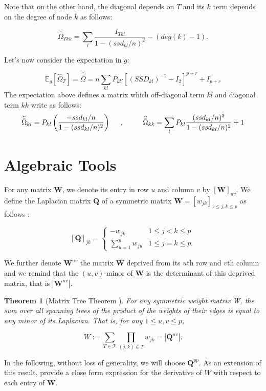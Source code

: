 \documentclass[11pt,a4paper]{article}
\newtheorem{theorem}{Theorem}
\newcommand{\Wbf}{\boldsymbol{W}}
\newcommand{\Qbf}{\boldsymbol{Q}}
\newcommand{\Esp}{\mathds{E}}
\newcommand{\had}{\boldsymbol{\cdot}}
\begin{document}
 Note that on the other hand, the diagonal depends on $T$ and its $k$ term depends on the degree of node $k$ as follows:

$$\widehat{\Omega}_{Tkk} =\sum_l \frac{I_{Tkl} }{1-(ssd_{kl}/n)^2} -(deg(k)-1).$$
 
Let's now consider the expectation in $g$:

$$\Esp_g[\widehat{\Omega}_T]= \widehat{\bar{\Omega}}= n\sum_{kl} P_{kl} \had [(SSD_{kl})^{-1} - I_2]^{p+r} + I_{p+r}$$
 The expectation above defines a matrix which off-diagonal term $kl$ and diagonal term $kk$ write as follows:
$$\widehat{\bar{\Omega}}_{kl} = P_{kl} \left(\frac{-ssd_{kl}/n}{1-(ssd_{kl}/n)^2} \right)\text{\hspace{0.5cm},\hspace{1cm}}\widehat{\bar{\Omega}}_{kk} = \sum_l P_{kl} \frac{(ssd_{kl}/n)^2}{1-(ssd_{kl}/n)^2} +1 $$
 
 
\newpage

 \appendix
 \section{Algebraic Tools}
 For any matrix $\Wbf$, we denote its entry in row $u$ and column $v$ by $[\Wbf]_{uv}$. We define the Laplacian matrix $\Qbf$ of a symmetric matrix $\Wbf=[w_{jk} ]_{1\leq j,k\leq p}$ as follows :
 
\[
 [\Qbf]_{jk}  =\begin{cases}
    -w_{jk}  & 1\leq j<k \leq p\\
    \sum_{u=1}^p w_{ju} & 1\leq j=k \leq p.
    \end{cases}
\]
 
We further denote $\Wbf^{uv}$ the matrix $\Wbf$ deprived from its $u$th row and $v$th column and we remind that the $(u, v)$-minor of $\Wbf$ is the determinant of this deprived matrix, that is $|\Wbf^{uv}|$.

\begin{theorem}[Matrix Tree Theorem  \cite{matrixtree,Meila}] \label{thm:MTT}
    For any symmetric weight matrix W, the sum over all spanning trees of the product of the weights of their edges is equal to any minor of its Laplacian. That is, for any $1 \leq u, v \leq p$,
 
   \[
    W := \sum_{T\in\mathcal{T}} \prod_{(j, k)\in T} w_{jk} = |\Qbf^{uv}|.
    \]
   
\end{theorem}    

In the following, without loss of generality, we will choose $\Qbf^{pp}$. As an extension of this result, \cite{Meila} provide a close form expression for the derivative of $W$ with respect to each entry of $\Wbf$. 
\end{document}
